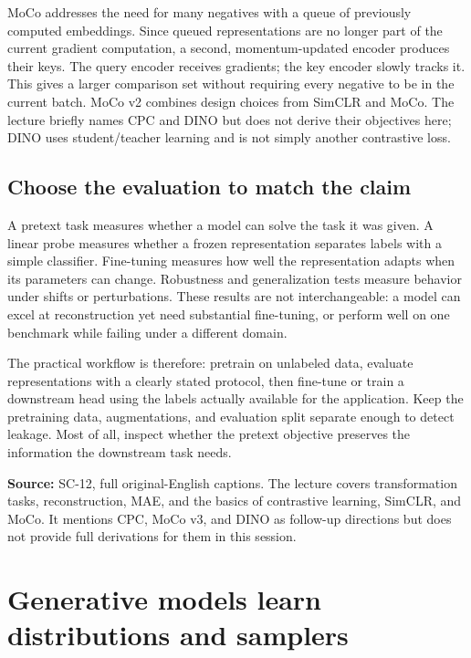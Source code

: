 MoCo addresses the need for many negatives with a queue of previously computed embeddings. Since queued representations are no longer part of the current gradient computation, a second, momentum-updated encoder produces their keys. The query encoder receives gradients; the key encoder slowly tracks it. This gives a larger comparison set without requiring every negative to be in the current batch. MoCo v2 combines design choices from SimCLR and MoCo. The lecture briefly names CPC and DINO but does not derive their objectives here; DINO uses student/teacher learning and is not simply another contrastive loss.

\subsection{Choose the evaluation to match the claim}\label{04-visual-computing-ii-ch031-choose-the-evaluation-to-match-the-claim}

\hypertarget{04-visual-computing-ii-ch031-choose-the-evaluation-to-match-the-claim}{}

A pretext task measures whether a model can solve the task it was given. A linear probe measures whether a frozen representation separates labels with a simple classifier. Fine-tuning measures how well the representation adapts when its parameters can change. Robustness and generalization tests measure behavior under shifts or perturbations. These results are not interchangeable: a model can excel at reconstruction yet need substantial fine-tuning, or perform well on one benchmark while failing under a different domain.

The practical workflow is therefore: pretrain on unlabeled data, evaluate representations with a clearly stated protocol, then fine-tune or train a downstream head using the labels actually available for the application. Keep the pretraining data, augmentations, and evaluation split separate enough to detect leakage. Most of all, inspect whether the pretext objective preserves the information the downstream task needs.

\textbf{Source:} SC-12, full original-English captions. The lecture covers transformation tasks, reconstruction, MAE, and the basics of contrastive learning, SimCLR, and MoCo. It mentions CPC, MoCo v3, and DINO as follow-up directions but does not provide full derivations for them in this session.

\section{Generative models learn distributions and samplers}\label{04-visual-computing-ii-ch031-generative-models-learn-distributions-and-samplers}

